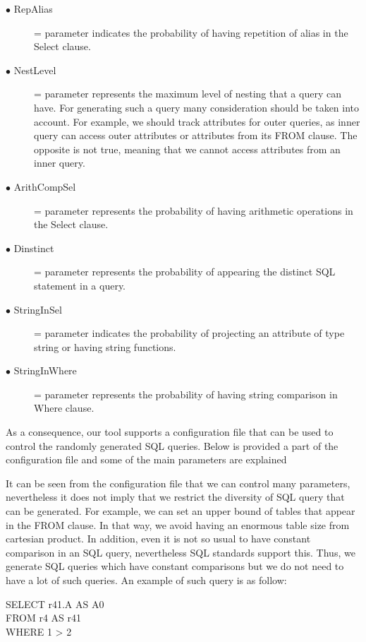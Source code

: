 \begin{description}
\item[$\bullet$ RepAlias]= parameter indicates the probability of having repetition of alias in the Select clause. 

\item[$\bullet$ NestLevel]= parameter represents the maximum level of nesting that a query can have. For generating such a query many consideration should be taken into account. For example, we should track attributes for outer queries, as inner query can access outer attributes or attributes from its FROM clause. The opposite is not true, meaning that we cannot access attributes from an inner query. 

\item[$\bullet$ ArithCompSel] = parameter represents the probability of having arithmetic operations in the Select clause. 

\item[$\bullet$ Dinstinct ] = parameter represents the probability of appearing the distinct SQL statement in a query. 

\item[$\bullet$ StringInSel] = parameter indicates the probability of projecting an attribute of type string or having string functions. 

\item[$\bullet$ StringInWhere] = parameter represents the probability of having string comparison in Where clause. 
\end{description} 

As a consequence, our tool supports a configuration file that can be used to control the randomly generated SQL queries. Below is provided a part of the configuration file and some of the main parameters are explained

It can be seen from the configuration file that we can control many parameters, nevertheless it does not imply that we restrict the diversity of SQL query that can be generated. For example, we can set an upper bound of tables that appear in the FROM clause. In that way, we avoid having an enormous table size from cartesian product. In addition, even it is not so usual to have constant comparison in an SQL query, nevertheless SQL standards support this. Thus, we generate SQL queries which have constant comparisons but we do not need to have a lot of such queries. An example of such query is as follow:

\begin{mdframed}[backgroundcolor=gray!20] 
SELECT r41.A AS A0
\\FROM r4 AS r41
\\WHERE 1 > 2
\end{mdframed}

